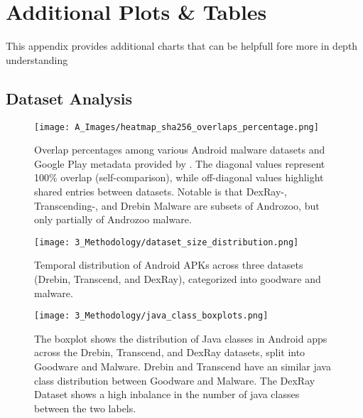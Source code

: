  
\chapter{Additional Plots \& Tables}
\label{appendiximages}
\label{appendix-more-details-on-template}

This appendix provides additional charts that can be helpfull fore more in depth understanding

\section{Dataset Analysis}\label{AppendixDatasetAnalysis}

\begin{figure*}[htb]
    \centering
    \begin{minipage}{1.5\textwidth}
        \centering
        \texttt{[image: A\_Images/heatmap\_sha256\_overlaps\_percentage.png]}
        \captionsetup{width=\textwidth}
        \caption{\label{fig:dataset_overlap}
        Overlap percentages among various Android malware datasets and Google Play metadata provided by \cite{gp_metadata}. 
        The diagonal values represent 100\% overlap (self-comparison), 
        while off-diagonal values highlight shared entries between datasets.
        Notable is that DexRay-, Transcending-, and Drebin Malware are subsets of Androzoo,
        but only partially of Androzoo malware.
        }
    \end{minipage}
\end{figure*}

\newpage

\begin{figure*}[h]
    \centering
    \texttt{[image: 3\_Methodology/dataset\_size\_distribution.png]}
    \caption{\label{fig:dataset_size_evaluation}
    Temporal distribution of Android APKs across three datasets (Drebin, Transcend, and DexRay), 
    categorized into goodware and malware.}
\end{figure*}



\begin{figure*}[b!]
    \centering
    \begin{minipage}{1.5\textwidth}
        \centering
        \texttt{[image: 3\_Methodology/java\_class\_boxplots.png]}
        \captionsetup{width=\textwidth}
        \caption{\label{fig:java_class_boxplots}
        The boxplot shows the distribution of Java classes in Android apps 
        across the Drebin, Transcend, and DexRay datasets, 
        split into Goodware and Malware. 
        Drebin and Transcend have an similar java class distribution 
        between Goodware and Malware.
        The DexRay Dataset shows a high inbalance in the number of java classes 
        between the two labels.
        }
    \end{minipage}
\end{figure*}

